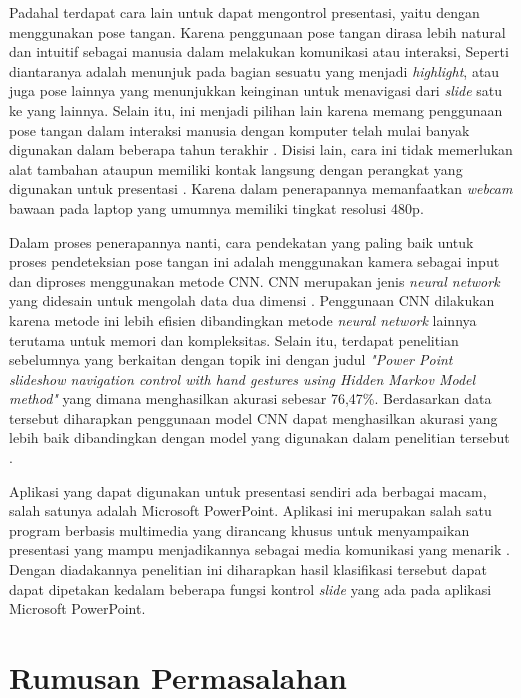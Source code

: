 Padahal terdapat cara lain untuk dapat mengontrol presentasi, yaitu dengan menggunakan pose tangan. Karena penggunaan pose tangan dirasa lebih natural dan intuitif sebagai manusia dalam melakukan komunikasi atau interaksi, Seperti diantaranya adalah menunjuk pada bagian sesuatu yang menjadi \emph{highlight}, atau juga pose lainnya yang menunjukkan keinginan untuk menavigasi dari \emph{slide} satu ke yang lainnya. Selain itu, ini menjadi pilihan lain karena memang penggunaan pose tangan dalam interaksi manusia dengan komputer telah mulai banyak digunakan dalam beberapa tahun terakhir \parencite{Indriani2021}. Disisi lain, cara ini tidak memerlukan alat tambahan ataupun memiliki kontak langsung dengan perangkat yang digunakan untuk presentasi \parencite{FariaSoroni2021}. Karena dalam penerapannya memanfaatkan \emph{webcam} bawaan pada laptop yang umumnya memiliki tingkat resolusi 480p.  

Dalam proses penerapannya nanti, cara pendekatan yang paling baik untuk proses pendeteksian pose tangan ini adalah menggunakan kamera sebagai input dan diproses menggunakan metode CNN. CNN merupakan jenis \emph{neural network} yang didesain untuk mengolah data dua dimensi \parencite{IWayan2016}. Penggunaan CNN dilakukan karena metode ini lebih efisien dibandingkan metode \emph{neural network} lainnya terutama untuk memori dan kompleksitas. Selain itu, terdapat penelitian sebelumnya yang berkaitan dengan topik ini dengan judul \emph{"Power Point slideshow navigation control with hand gestures using Hidden Markov Model method"} yang dimana menghasilkan akurasi sebesar 76,47\%. Berdasarkan data tersebut diharapkan penggunaan model CNN dapat menghasilkan akurasi yang lebih baik dibandingkan dengan model yang digunakan dalam penelitian tersebut \parencite{AhmedKadem2020}.

Aplikasi yang dapat digunakan untuk presentasi sendiri ada berbagai macam, salah satunya adalah Microsoft PowerPoint. Aplikasi ini merupakan salah satu program berbasis multimedia yang dirancang khusus untuk menyampaikan presentasi yang mampu menjadikannya sebagai media komunikasi yang menarik \parencite{Muthoharoh2019}. Dengan diadakannya penelitian ini diharapkan hasil klasifikasi tersebut dapat dapat dipetakan kedalam beberapa fungsi kontrol \emph{slide} yang ada pada aplikasi Microsoft PowerPoint.

\section{Rumusan Permasalahan}
\label{sec:permasalahan}

